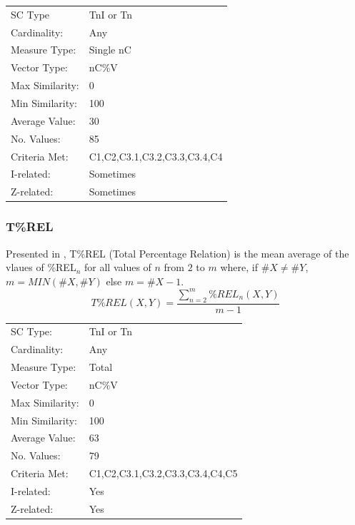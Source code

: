 \documentclass{article}
\begin{document}
\begin{center}
\begin{tabular}{ll}
 SC Type          &  TnI or Tn                     \\
 Cardinality:     &  Any                           \\
 Measure Type:    &  Single nC                     \\
 Vector Type:     &  nC\%V                         \\
 Max Similarity:  &  0                             \\
 Min Similarity:  &  100                           \\
 Average Value:   &  30                            \\
 No. Values:      &  85                            \\
 Criteria Met:    &  C1,C2,C3.1,C3.2,C3.3,C3.4,C4  \\
 I-related:       &  Sometimes                     \\
 Z-related:       &  Sometimes                     \\
\end{tabular}
\end{center}
\subsubsection{T\%REL}
\label{sec-15-8-4}

Presented in \citet{Castren1994}, T\%REL (Total Percentage Relation) is
the mean average of the vlaues of \%REL$_{n}$ for all values of $n$ from $2$
to $m$ where, if $\#X\neq\#Y$, $m = MIN(\#X,\#Y)$ else $m=\#X-1$.
$$T\%REL(X,Y)=\frac{\sum_{n=2}^{m}{\%REL_n\left(X,Y\right)}}{m-1}$$

\begin{center}
\begin{tabular}{ll}
 SC Type:         &  TnI or Tn                        \\
 Cardinality:     &  Any                              \\
 Measure Type:    &  Total                            \\
 Vector Type:     &  nC\%V                            \\
 Max Similarity:  &  0                                \\
 Min Similarity:  &  100                              \\
 Average Value:   &  63                               \\
 No. Values:      &  79                               \\
 Criteria Met:    &  C1,C2,C3.1,C3.2,C3.3,C3.4,C4,C5  \\
 I-related:       &  Yes                              \\
 Z-related:       &  Yes                              \\
\end{tabular}
\end{center}
\end{document}
